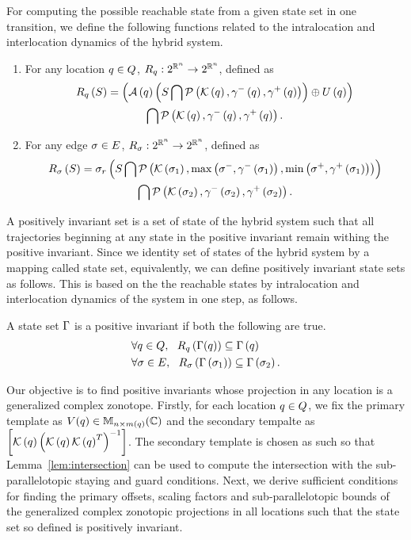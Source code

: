 For computing the possible reachable state from a given state set in
one transition, we define the following functions related to the
intralocation and interlocation dynamics of the hybrid system.
\begin{enumerate}
\item For any location $q\in Q$, $R_{q}:2^{\mathbb{R}^n}\rightarrow 2^{\mathbb{R}^n}$, defined as
\begin{multline*}
R_{q}\left(S\right) = \left(\mathcal{A}\left(q\right)\left(S\bigcap\mathcal{P}\left(\mathcal{K}\left(q\right),\gamma^-\left(q\right),\gamma^+\left(q\right)\right)\right)\oplus U\left(q\right)\right)\\  \bigcap \mathcal{P}\left(\mathcal{K}\left(q\right),\gamma^-\left(q\right),\gamma^+\left(q\right)\right).
\end{multline*}
\item For any edge $\sigma\in E$, $R_{\sigma}:2^{\mathbb{R}^n}\rightarrow 2^{\mathbb{R}^n}$, defined as
\begin{multline*}
R_{\sigma}\left(S\right) =  \sigma_r\left(S\bigcap \mathcal{P}\left(\mathcal{K}\left(\sigma_{1}\right),\max\left(\sigma^-,\gamma^-\left(\sigma_{1}\right)\right),\min\left(\sigma^+,\gamma^+\left(\sigma_{1}\right) \right)\right)\right) \\ \bigcap\mathcal{P}\left(\mathcal{K}\left(\sigma_{2}\right),\gamma^-\left(\sigma_{2}\right),\gamma^+\left(\sigma_{2}\right)\right).
\end{multline*}
\end{enumerate}

A positively invariant set is a set of state of the hybrid system such
that all trajectories beginning at any state in the positive invariant
remain withing the positive invariant.  Since we identity set of
states of the hybrid system by a mapping called state set,
equivalently, we can define positively invariant state sets as
follows. This is based on the the reachable states by
intralocation and interlocation dynamics of the system in one step,
as follows.

\begin{definition}
A state set $\Gamma$ is a positive invariant if
both the following are true.
\begin{align}
& \forall q\in Q,~~R_{q}\left(\Gamma(q)\right) \subseteq \Gamma\left(q\right)\\
& \forall\sigma\in E,~~R_{\sigma}\left(\Gamma\left(\sigma_{1}\right)\right) \subseteq
  \Gamma\left(\sigma_{2}\right).
\end{align}
\end{definition}


Our objective is to find positive invariants whose projection in any
location is a generalized complex zonotope.  Firstly, for each
location $q\in Q$, we fix the primary template as
$V(q)\in\mathbb{M}_{n\times m(q)}(\mathbb{\mathbb{C}})$ and the secondary tempalte as
$\left[\mathcal{K}\left(q\right)\left(\mathcal{K}\left(q\right)\mathcal{K}\left(q\right)^T\right)^{-1}\right]$.  The secondary template
is chosen as such so that Lemma~\ref{lem:intersection} can be used to
compute the intersection with the sub-parallelotopic staying and guard
conditions.  Next, we derive sufficient conditions for finding the
primary offsets, scaling factors and sub-parallelotopic bounds of the
generalized complex zonotopic projections in all locations such that
the state set so defined is positively invariant.

